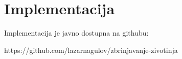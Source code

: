 \section{Implementacija}
\par Implementacija je javno dostupna na githubu: 
\begin{center}
    https://github.com/lazarnagulov/zbrinjavanje-zivotinja
\end{center}